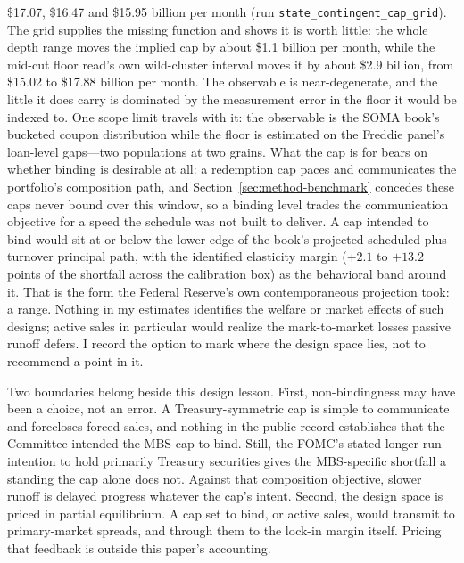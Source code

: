\documentclass[12pt]{article}
\begin{document}
\$17.07, \$16.47 and \$15.95 billion per month (run \texttt{state\_contingent\_cap\_grid}). The grid supplies the missing function and shows it is worth little: the whole depth range moves the implied cap by about \$1.1 billion per month, while the mid-cut floor read's own wild-cluster interval moves it by about \$2.9 billion, from \$15.02 to \$17.88 billion per month. The observable is near-degenerate, and the little it does carry is dominated by the measurement error in the floor it would be indexed to. One scope limit travels with it: the observable is the SOMA book's bucketed coupon distribution while the floor is estimated on the Freddie panel's loan-level gaps---two populations at two grains. What the cap is for bears on whether binding is desirable at all: a redemption cap paces and communicates the portfolio's composition path, and Section~\ref{sec:method-benchmark} concedes these caps never bound over this window, so a binding level trades the communication objective for a speed the schedule was not built to deliver. A cap intended to bind would sit at or below the lower edge of the book's projected scheduled-plus-turnover principal path, with the identified elasticity margin ($+2.1$ to $+13.2$ points of the shortfall across the calibration box) as the behavioral band around it. That is the form the Federal Reserve's own contemporaneous projection took: a range. Nothing in my estimates identifies the welfare or market effects of such designs; active sales in particular would realize the mark-to-market losses passive runoff defers. I record the option to mark where the design space lies, not to recommend a point in it.

Two boundaries belong beside this design lesson. First, non-bindingness may have been a choice, not an error. A Treasury-symmetric cap is simple to communicate and forecloses forced sales, and nothing in the public record establishes that the Committee intended the MBS cap to bind. Still, the FOMC's stated longer-run intention to hold primarily Treasury securities gives the MBS-specific shortfall a standing the cap alone does not. Against that composition objective, slower runoff is delayed progress whatever the cap's intent. Second, the design space is priced in partial equilibrium. A cap set to bind, or active sales, would transmit to primary-market spreads, and through them to the lock-in margin itself. Pricing that feedback is outside this paper's accounting.
\end{document}
